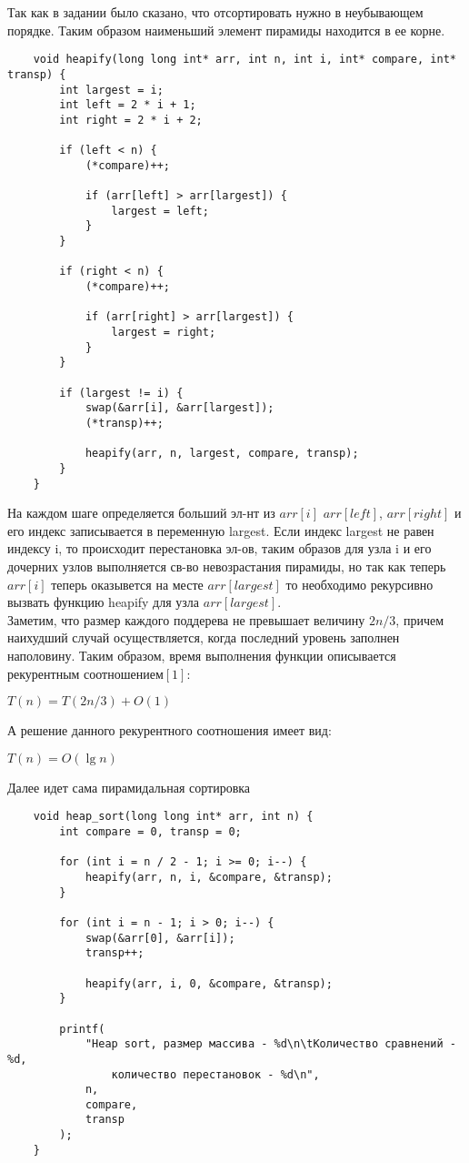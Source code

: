 \documentclass[a4paper,12pt,titlepage,finall]{article}
\begin{document}
Так как в задании было сказано, что отсортировать нужно в неубывающем порядке.
Таким образом наименьший элемент пирамиды находится в ее корне.

\begin{verbatim}
    void heapify(long long int* arr, int n, int i, int* compare, int* transp) {
        int largest = i;
        int left = 2 * i + 1;
        int right = 2 * i + 2;

        if (left < n) {
            (*compare)++;

            if (arr[left] > arr[largest]) {
                largest = left;
            }
        }

        if (right < n) {
            (*compare)++;

            if (arr[right] > arr[largest]) {
                largest = right;
            }
        }

        if (largest != i) {
            swap(&arr[i], &arr[largest]);
            (*transp)++;

            heapify(arr, n, largest, compare, transp);
        }
    }    
\end{verbatim}

На каждом шаге определяется больший эл-нт из $arr[i]$ $arr[left]$, $arr[right]$ и его
индекс записывается в переменную largest. Если индекс largest не равен
индексу i, то происходит перестановка эл-ов, таким образов для 
узла i и его дочерних узлов выполняется св-во невозрастания пирамиды, но так как 
теперь $arr[i]$ теперь оказывется на месте $arr[largest]$ то необходимо
рекурсивно вызвать функцию heapify для узла $arr[largest]$.
\\
Заметим, что размер каждого поддерева не превышает величину $2n/3$, причем наихудший
случай осуществляется, когда последний уровень заполнен наполовину. Таким образом,
время выполнения функции описывается рекурентным соотношением$[1]$: 
\begin{center}
    $T(n) = T(2n/3) + O(1)$
\end{center}

А решение данного рекурентного соотношения имеет вид:
\begin{center}
    $T(n) = O(\lg n)$
\end{center}

Далее идет сама пирамидальная сортировка

\begin{verbatim}
    void heap_sort(long long int* arr, int n) {
        int compare = 0, transp = 0;

        for (int i = n / 2 - 1; i >= 0; i--) {
            heapify(arr, n, i, &compare, &transp);
        }

        for (int i = n - 1; i > 0; i--) {
            swap(&arr[0], &arr[i]);
            transp++;

            heapify(arr, i, 0, &compare, &transp);
        }

        printf(
            "Heap sort, размер массива - %d\n\tКоличество сравнений - %d,
                количество перестановок - %d\n",
            n,
            compare,
            transp
        );
    }
\end{verbatim}
\end{document}
